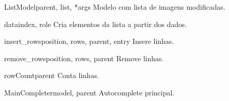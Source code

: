 \documentclass[letterpaper,10pt,portuguese]{manual}
\begin{document}
\hypertarget{veliger.ListModel}{}\begin{classdesc}{ListModel}{parent, list, *args}
Modelo com lista de imagens modificadas.

\hypertarget{veliger.ListModel.data}{}\begin{methoddesc}{data}{index, role}
Cria elementos da lista a partir dos dados.
\end{methoddesc}

\hypertarget{veliger.ListModel.insert\_rows}{}\begin{methoddesc}{insert\_rows}{position, rows, parent, entry}
Insere linhas.
\end{methoddesc}

\hypertarget{veliger.ListModel.remove\_rows}{}\begin{methoddesc}{remove\_rows}{position, rows, parent}
Remove linhas.
\end{methoddesc}

\hypertarget{veliger.ListModel.rowCount}{}\begin{methoddesc}{rowCount}{parent}
Conta linhas.
\end{methoddesc}
\end{classdesc}

\hypertarget{veliger.MainCompleter}{}\begin{classdesc}{MainCompleter}{model, parent}
Autocomplete principal.
\end{classdesc}
\end{document}
